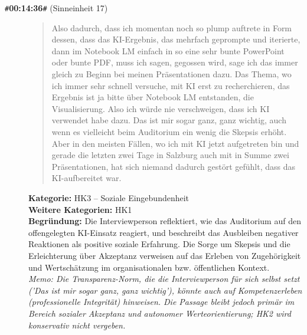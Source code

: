 \begin{description}
  \item[\texttt{\#}\textbf{00:14:36}\texttt{\#} (Sinneinheit 17)]
  \begin{quote}
  Also dadurch, dass ich momentan noch so plump auftrete in Form dessen, dass das KI-Ergebnis, das mehrfach geprompte und iterierte, dann im Notebook LM einfach in so eine sehr bunte PowerPoint oder bunte PDF, muss ich sagen, gegossen wird, sage ich das immer gleich zu Beginn bei meinen Präsentationen dazu. Das Thema, wo ich immer sehr schnell versuche, mit KI erst zu recherchieren, das Ergebnis ist ja bitte über Notebook LM entstanden, die Visualisierung. Also ich würde nie verschweigen, dass ich KI verwendet habe dazu. Das ist mir sogar ganz, ganz wichtig, auch wenn es vielleicht beim Auditorium ein wenig die Skepsis erhöht. Aber in den meisten Fällen, wo ich mit KI jetzt aufgetreten bin und gerade die letzten zwei Tage in Salzburg auch mit in Summe zwei Präsentationen, hat sich niemand dadurch gestört gefühlt, dass das KI-aufbereitet war.
  \end{quote}
  \textbf{Kategorie:} HK3 -- Soziale Eingebundenheit\\
  \textbf{Weitere Kategorien:} HK1\\
  \textbf{Begr\"undung:} Die Interviewperson reflektiert, wie das Auditorium auf den offengelegten KI-Einsatz reagiert, und beschreibt das Ausbleiben negativer Reaktionen als positive soziale Erfahrung. Die Sorge um Skepsis und die Erleichterung über Akzeptanz verweisen auf das Erleben von Zugehörigkeit und Wertschätzung im organisationalen bzw. öffentlichen Kontext.
  \\\textit{Memo: Die Transparenz-Norm, die die Interviewperson für sich selbst setzt ('Das ist mir sogar ganz, ganz wichtig'), könnte auch auf Kompetenzerleben (professionelle Integrität) hinweisen. Die Passage bleibt jedoch primär im Bereich sozialer Akzeptanz und autonomer Werteorientierung; HK2 wird konservativ nicht vergeben.}
\end{description}
\medskip

